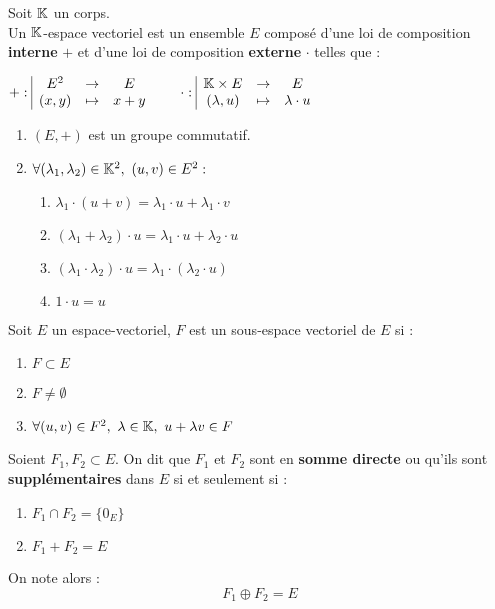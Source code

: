 \begin{definition}
	Soit $\mathbb{K}$ un corps. 
	\\
	Un $\mathbb{K}$-espace vectoriel est un ensemble $E$ composé d'une loi de composition \textbf{interne} \og $+$ \fg et d'une loi de composition \textbf{externe} \og $\cdot$ \fg telles que :
	\begin{center}
		$
		+ :
		\begin{array}{|ccc}
			 E^2 & \to & E \\
			(x,y) & \mapsto & x + y
		\end{array}
		\qquad 
		\cdot :
		\begin{array}{|ccc}
			 \mathbb{K} \times E & \to & E \\
			(\lambda, u) & \mapsto & \lambda \cdot u
		\end{array}
		$	
	\end{center}		
	
	\begin{enumerate}
		\item $(E, +)$ est un groupe commutatif.
		\item $\forall (\lambda_1, \lambda_2) \in \mathbb{K}^2,\ (u, v) \in E^2 :$
		\begin{enumerate}
			\item $\lambda_1 \cdot (u + v) = \lambda_1 \cdot u + \lambda_1 \cdot v$
			\item $(\lambda_1 + \lambda_2) \cdot u = \lambda_1 \cdot u + \lambda_2 \cdot u$
			\item $(\lambda_1 \cdot \lambda_2) \cdot u = \lambda_1 \cdot (\lambda_2 \cdot u)$
			\item $1 \cdot u = u$
		\end{enumerate}
	\end{enumerate}
\end{definition}

\begin{definition}
	Soit $E$ un espace-vectoriel, $F$ est un sous-espace vectoriel de $E$ si :
	\begin{enumerate}
    		\item $F \subset E$
    		\item $F \neq \emptyset$
    		\item $\forall (u, v) \in F^2,\ \lambda \in \mathbb{K},\ u + \lambda v \in F$
    	\end{enumerate}
\end{definition}

\begin{definition}
	Soient $F_1, F_2 \subset E$. On dit que $F_1$ et $F_2$ sont en \textbf{somme directe} ou qu'ils sont \textbf{supplémentaires} dans $E$ si et seulement si :
	\begin{multicols}{2}
	    \begin{enumerate}
		\item $F_1 \cap F_2 = \{ 0_E \}$
		\item $F_1 + F_2 = E$
	\end{enumerate}
	\end{multicols}
	On note alors :
	\[ F_1 \oplus F_2 = E \]
\end{definition}

